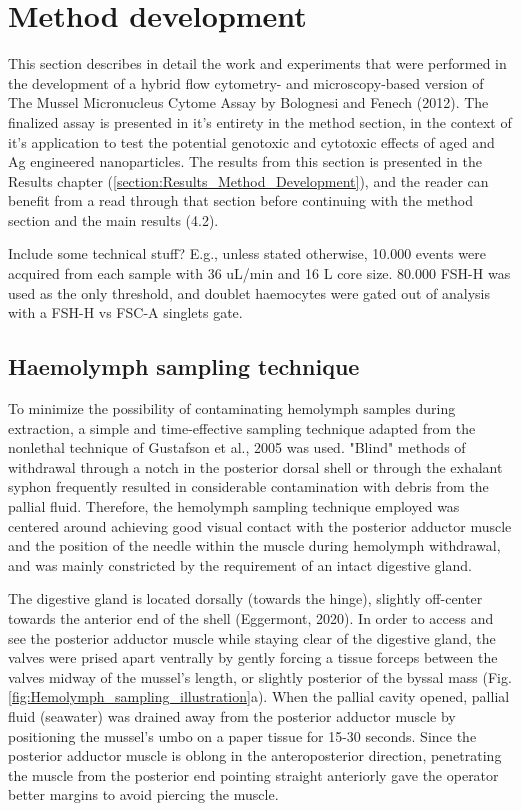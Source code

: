 \section{Method development}
This section describes in detail the work and experiments that were performed in the development of a hybrid flow cytometry- and microscopy-based version of The Mussel Micronucleus Cytome Assay by Bolognesi and Fenech (2012). The finalized assay is presented in it's entirety in the method section, in the context of it's application to test the potential genotoxic and cytotoxic effects of aged  and Ag engineered nanoparticles. The results from this section is presented in the Results chapter (\ref{section:Results_Method_Development}), and the reader can benefit from a read through that section before continuing with the method section and the main results (4.2).

Include some technical stuff? E.g., unless stated otherwise, 10.000 events were acquired from each sample with 36 uL/min and 16 \micro L core size. 80.000 FSH-H was used as the only threshold, and doublet haemocytes were gated out of analysis with a FSH-H vs FSC-A singlets gate.

\subsection{Haemolymph sampling technique}
\label{subsection:haemolymph sampling technique}
To minimize the possibility of contaminating hemolymph samples during extraction, a simple and time-effective sampling technique adapted from the nonlethal technique of Gustafson et al., 2005 was used. "Blind" methods of withdrawal through a notch in the posterior dorsal shell or through the exhalant syphon frequently resulted in considerable contamination with debris from the pallial fluid. Therefore, the hemolymph sampling technique employed was centered around achieving good visual contact with the posterior adductor muscle and the position of the needle within the muscle during hemolymph withdrawal, and was mainly constricted by the requirement of an intact digestive gland.

The digestive gland is located dorsally (towards the hinge), slightly off-center towards the anterior end of the shell (Eggermont, 2020). In order to access and see the posterior adductor muscle while staying clear of the digestive gland, the valves were prised apart ventrally by gently forcing a tissue forceps between the valves midway of the mussel's length, or slightly posterior of the byssal mass (Fig. \ref{fig:Hemolymph_sampling_illustration}a). When the pallial cavity opened, pallial fluid (seawater) was drained away from the posterior adductor muscle by positioning the mussel's umbo on a paper tissue for 15-30 seconds. Since the posterior adductor muscle is oblong in the anteroposterior direction, penetrating the muscle from the posterior end pointing straight anteriorly gave the operator better margins to avoid piercing the muscle.

